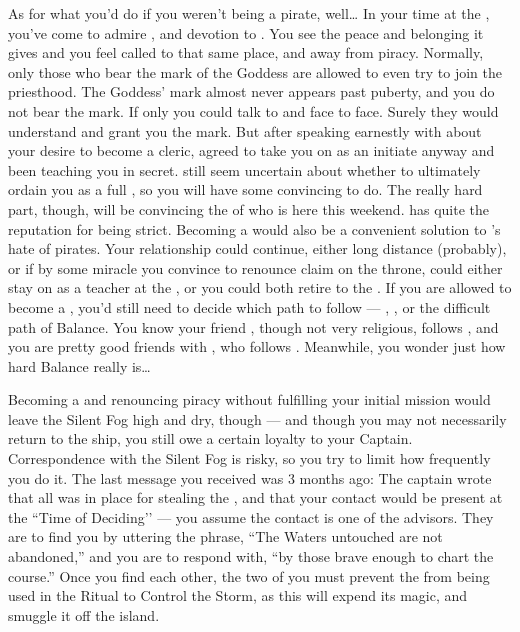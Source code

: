 \documentclass[char]{GL2020}
\begin{document}
As for what you'd do if you weren't being a pirate, well\ldots{} In your time at the \pSc{}, you've come to admire \cFlowPriest{\intro}, and \cFlowPriest{\their} devotion to \cFlow{\intro}. You see the peace and belonging it gives \cFlowPriest{\them} and you feel called to that same place, and away from piracy. Normally, only those who bear the mark of the Goddess are allowed to even try to join the priesthood. The Goddess' mark almost never appears past puberty, and you do not bear the mark. If only you could talk to \cEbb{\intro} and \cFlow{} face to face. Surely they would understand and grant you the mark. But after speaking earnestly with \cFlowPriest{} about your desire to become a cleric, \cFlowPriest{\they} agreed to take you on as an initiate anyway and \cFlowPriest{\have} been teaching you in secret. \cFlowPriest{\They} still seem\cFlowPriest{\verbs} uncertain about whether to ultimately ordain you as a full \cPirate{\cleric}, so you will have some convincing to do. The really hard part, though, will be convincing the \cEbbPriest{\cleric} of \cEbb{} who is here this weekend. \cEbbPriest{\intro} has quite the reputation for being strict. Becoming a \cPirate{\cleric} would also be a convenient solution to \cPrince{}'s hate of pirates. Your relationship could continue, either long distance (probably), or if by some miracle you convince \cPrince{} to renounce \cPrince{\their} claim on the throne, \cPrince{\they} could either stay on as a teacher at the \pSc{}, or you could both retire to the \pShip{}. If you are allowed to become a \cPirate{\cleric}, you'd still need to decide which path to follow — \cEbb{}, \cFlow{}, or the difficult path of Balance. You know your friend \cBunker{}, though not very religious, follows \cEbb{}, and you are pretty good friends with \cFlowPriest{}, who follows \cFlow{}. Meanwhile, you wonder just how hard Balance really is\ldots{}

Becoming a \cPirate{\cleric} and renouncing piracy without fulfilling your initial mission would leave the Silent Fog high and dry, though — and though you may not necessarily return to the ship, you still owe a certain loyalty to your Captain. Correspondence with the Silent Fog is risky, so you try to limit how frequently you do it. The last message you received was 3 months ago: The captain wrote that all was in place for stealing the \iNet{}, and that your contact would be present at the ``Time of Deciding’’ — you assume the contact is one of the advisors. They are to find you by uttering the phrase, ``The Waters untouched are not abandoned,'' and you are to respond with, ``by those brave enough to chart the course.'' Once you find each other, the two of you must prevent the \iNet{} from being used in the Ritual to Control the Storm, as this will expend its magic, and smuggle it off the island.
\end{document}
